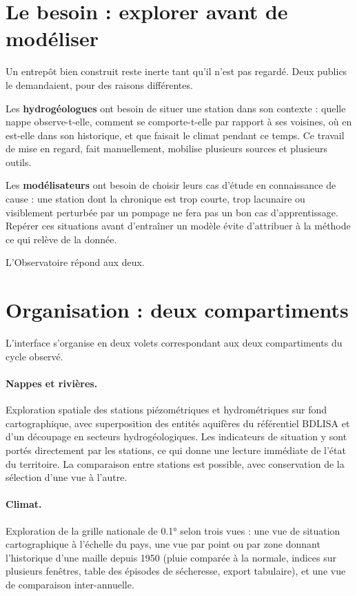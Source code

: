 \section{Le besoin : explorer avant de modéliser}

Un entrepôt bien construit reste inerte tant qu'il n'est pas regardé. Deux publics le
demandaient, pour des raisons différentes.

Les \textbf{hydrogéologues} ont besoin de situer une station dans son contexte : quelle nappe
observe-t-elle, comment se comporte-t-elle par rapport à ses voisines, où en est-elle dans son
historique, et que faisait le climat pendant ce temps. Ce travail de mise en regard, fait
manuellement, mobilise plusieurs sources et plusieurs outils.

Les \textbf{modélisateurs} ont besoin de choisir leurs cas d'étude en connaissance de cause :
une station dont la chronique est trop courte, trop lacunaire ou visiblement perturbée par un
pompage ne fera pas un bon cas d'apprentissage. Repérer ces situations avant d'entraîner un
modèle évite d'attribuer à la méthode ce qui relève de la donnée.

L'Observatoire répond aux deux.

\section{Organisation : deux compartiments}

L'interface s'organise en deux volets correspondant aux deux compartiments du cycle observé.

\paragraph{Nappes et rivières.} Exploration spatiale des stations piézométriques et
hydrométriques sur fond cartographique, avec superposition des entités aquifères du référentiel
BDLISA et d'un découpage en secteurs hydrogéologiques. Les indicateurs de situation y sont
portés directement par les stations, ce qui donne une lecture immédiate de l'état du territoire.
La comparaison entre stations est possible, avec conservation de la sélection d'une vue à
l'autre.

\paragraph{Climat.} Exploration de la grille nationale de \ang{0.1} selon trois vues : une vue de
situation cartographique à l'échelle du pays, une vue par point ou par zone donnant l'historique
d'une maille depuis 1950 (pluie comparée à la normale, indices sur plusieurs fenêtres, table des
épisodes de sécheresse, export tabulaire), et une vue de comparaison inter-annuelle.

